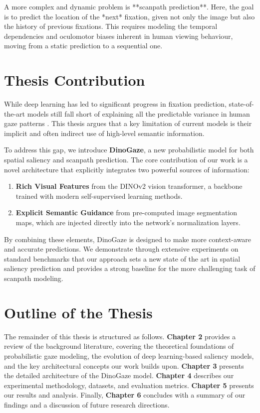 A more complex and dynamic problem is **scanpath prediction**. Here, the goal is to predict the location of the *next* fixation, given not only the image but also the history of previous fixations. This requires modeling the temporal dependencies and oculomotor biases inherent in human viewing behaviour, moving from a static prediction to a sequential one.

\section{Thesis Contribution}
\label{sec:intro_contribution}

While deep learning has led to significant progress in fixation prediction, state-of-the-art models still fall short of explaining all the predictable variance in human gaze patterns \cite{kummerer2023predicting, kummerer2022deepgaze}. This thesis argues that a key limitation of current models is their implicit and often indirect use of high-level semantic information.

To address this gap, we introduce \textbf{DinoGaze}, a new probabilistic model for both spatial saliency and scanpath prediction. The core contribution of our work is a novel architecture that explicitly integrates two powerful sources of information:
\begin{enumerate}
    \item \textbf{Rich Visual Features} from the DINOv2 vision transformer, a backbone trained with modern self-supervised learning methods.
    \item \textbf{Explicit Semantic Guidance} from pre-computed image segmentation maps, which are injected directly into the network's normalization layers.
\end{enumerate}
By combining these elements, DinoGaze is designed to make more context-aware and accurate predictions. We demonstrate through extensive experiments on standard benchmarks that our approach sets a new state of the art in spatial saliency prediction and provides a strong baseline for the more challenging task of scanpath modeling.

\section{Outline of the Thesis}
\label{sec:intro_outline}

The remainder of this thesis is structured as follows. \textbf{Chapter 2} provides a review of the background literature, covering the theoretical foundations of probabilistic gaze modeling, the evolution of deep learning-based saliency models, and the key architectural concepts our work builds upon. \textbf{Chapter 3} presents the detailed architecture of the DinoGaze model. \textbf{Chapter 4} describes our experimental methodology, datasets, and evaluation metrics. \textbf{Chapter 5} presents our results and analysis. Finally, \textbf{Chapter 6} concludes with a summary of our findings and a discussion of future research directions.


